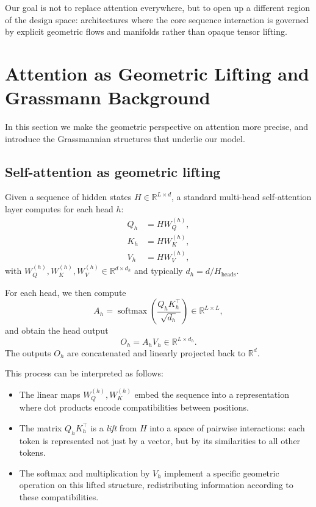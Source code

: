 \documentclass[11pt]{article}
\begin{document}
Our goal is not to replace attention everywhere, but to open up a different region of the design space: architectures where the core sequence interaction is governed by explicit geometric flows and manifolds rather than opaque tensor lifting.

\section{Attention as Geometric Lifting and Grassmann Background}

In this section we make the geometric perspective on attention more precise, and introduce the Grassmannian structures that underlie our model.

\subsection{Self-attention as geometric lifting}

Given a sequence of hidden states $H \in \mathbb{R}^{L \times d}$, a standard multi-head self-attention layer computes for each head $h$:
\begin{align}
Q_h &= H W_Q^{(h)}, \\
K_h &= H W_K^{(h)}, \\
V_h &= H W_V^{(h)},
\end{align}
with $W_Q^{(h)}, W_K^{(h)}, W_V^{(h)} \in \mathbb{R}^{d \times d_h}$ and typically $d_h = d / H_{\text{heads}}$.

For each head, we then compute
\[
A_h = \operatorname{softmax}\left(\frac{Q_h K_h^\top}{\sqrt{d_h}}\right) \in \mathbb{R}^{L \times L},
\]
and obtain the head output
\[
O_h = A_h V_h \in \mathbb{R}^{L \times d_h}.
\]
The outputs $O_h$ are concatenated and linearly projected back to $\mathbb{R}^d$.

This process can be interpreted as follows:

\begin{itemize}
    \item The linear maps $W_Q^{(h)}, W_K^{(h)}$ embed the sequence into a representation where dot products encode compatibilities between positions.
    \item The matrix $Q_h K_h^\top$ is a \emph{lift} from $H$ into a space of pairwise interactions: each token is represented not just by a vector, but by its similarities to all other tokens.
    \item The softmax and multiplication by $V_h$ implement a specific geometric operation on this lifted structure, redistributing information according to these compatibilities.
\end{itemize}
\end{document}
